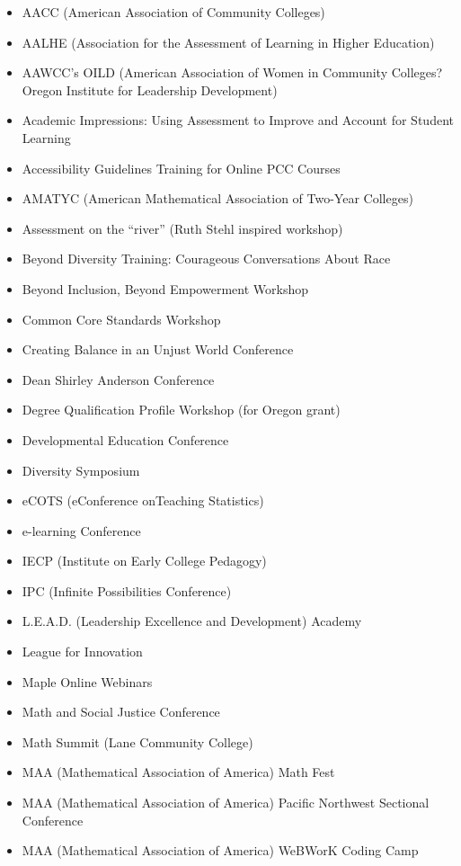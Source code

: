 \begin{itemize}[label={}]
\item AACC (American Association of Community Colleges)
\item AALHE (Association for the Assessment of Learning in Higher Education)
\item AAWCC's OILD (American Association of Women in Community Colleges? Oregon Institute for Leadership Development)
\item Academic Impressions: Using Assessment to Improve and Account for Student Learning
\item Accessibility Guidelines Training for Online PCC Courses
\item AMATYC (American Mathematical Association of Two-Year Colleges)
\item Assessment on the ``river'' (Ruth Stehl inspired workshop)
\item Beyond Diversity Training: Courageous Conversations About Race
\item Beyond Inclusion, Beyond Empowerment Workshop
\item Common Core Standards Workshop
\item Creating Balance in an Unjust World Conference
\item Dean Shirley Anderson Conference
\item Degree Qualification Profile Workshop (for Oregon grant)
\item Developmental Education Conference
\item Diversity Symposium
\item eCOTS  (eConference onTeaching Statistics)
\item e-learning Conference
\item IECP (Institute on Early College Pedagogy)
\item IPC (Infinite Possibilities Conference)
\item L.E.A.D. (Leadership Excellence and Development) Academy
\item League for Innovation
\item Maple Online Webinars
\item Math and Social Justice Conference
\item Math Summit (Lane Community College)
\item MAA (Mathematical Association of America) Math Fest
\item MAA (Mathematical Association of America) Pacific Northwest Sectional Conference
\item MAA (Mathematical Association of America) WeBWorK Coding Camp

\end{itemize}
